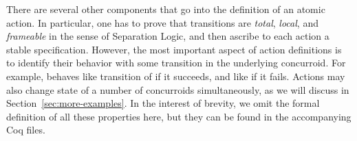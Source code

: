 There are several other components that go into the definition of an
atomic action. In particular, one has to prove that transitions are
\emph{total}, \emph{local}, and \emph{frameable} in the sense of
Separation Logic, and then ascribe to each action a stable
specification. However, the most important aspect of action
definitions is to identify their behavior with some transition in the
underlying concurroid. For example,  behaves like
 transition of  if it succeeds,
and like  if it fails.  Actions may also change state of a
number of concurroids simultaneously, as we will discuss in
Section~\ref{sec:more-examples}.  In the interest of brevity, we omit
the formal definition of all these properties here, but they can be
found in the accompanying Coq files.

